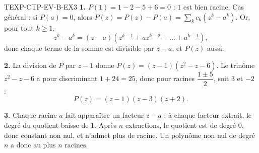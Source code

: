 \begin{corrige}{TEXP-CTP-EV-B-EX3}
\textbf{1.} $P(1)=1-2-5+6=0$ : $1$ est bien racine. Cas général : si $P(a)=0$, alors
$P(z)=P(z)-P(a)=\sum_k c_k\left(z^k-a^k\right)$. Or, pour tout $k\geq1$,
\[
  z^k-a^k=(z-a)\left(z^{k-1}+az^{k-2}+\dots+a^{k-1}\right),
\]
donc chaque terme de la somme est divisible par $z-a$, et $P(z)$ aussi.

\textbf{2.} La division de $P$ par $z-1$ donne $P(z)=(z-1)(z^2-z-6)$. Le trinôme
$z^2-z-6$ a pour discriminant $1+24=25$, donc pour racines $\dfrac{1\pm5}{2}$, soit $3$ et $-2$ :
\[
  P(z)=(z-1)(z-3)(z+2).
\]

\textbf{3.} Chaque racine $a$ fait apparaître un facteur $z-a$ ; à chaque facteur extrait, le degré du quotient baisse de $1$. Après $n$ extractions, le quotient est de degré $0$, donc constant non nul, et n'admet plus de racine. Un polynôme non nul de degré $n$ a donc au plus $n$ racines.
\end{corrige}
